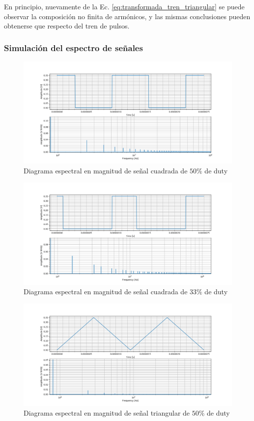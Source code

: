 En principio, nuevamente de la Ec. \ref{eq:transformada_tren_triangular} se puede observar la composici\'on no finita de arm\'onicos, y las mismas conclusiones pueden obtenerse que respecto del tren de pulsos.


\subsubsection{Simulaci\'on del espectro de se\~nales}

\begin{figure}[H]
    \centering
    \includegraphics[scale=0.46]{Recursos/cuadrada_50_ejercicio_3.png}
    \caption{Diagrama espectral en magnitud de se\~nal cuadrada de  $50\%$ de duty}
\end{figure}

\begin{figure}[H]
    \centering
    \includegraphics[scale=0.46]{Recursos/cuadrada_33_ejercicio_3.png}
    \caption{Diagrama espectral en magnitud de se\~nal cuadrada de  $33\%$ de duty}
\end{figure}

\begin{figure}[H]
    \centering
    \includegraphics[scale=0.46]{Recursos/triangular_50_ejercicio_3.png}
    \caption{Diagrama espectral en magnitud de se\~nal triangular de  $50\%$ de duty}
\end{figure}

